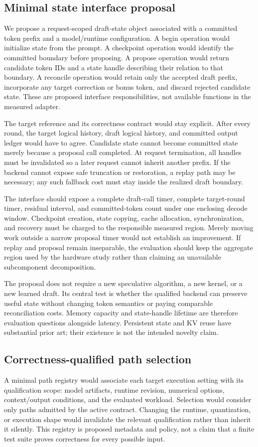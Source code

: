 \subsection{Minimal state interface proposal}
We propose a request-scoped draft-state object associated with a committed token prefix and a model/runtime configuration. A begin operation would initialize state from the prompt. A checkpoint operation would identify the committed boundary before proposing. A propose operation would return candidate token IDs and a state handle describing their relation to that boundary. A reconcile operation would retain only the accepted draft prefix, incorporate any target correction or bonus token, and discard rejected candidate state. These are proposed interface responsibilities, not available functions in the measured adapter.

The target reference and its correctness contract would stay explicit. After every round, the target logical history, draft logical history, and committed output ledger would have to agree. Candidate state cannot become committed state merely because a proposal call completed. At request termination, all handles must be invalidated so a later request cannot inherit another prefix. If the backend cannot expose safe truncation or restoration, a replay path may be necessary; any such fallback cost must stay inside the realized draft boundary.

The interface should expose a complete draft-call timer, complete target-round timer, residual interval, and committed-token count under one enclosing decode window. Checkpoint creation, state copying, cache allocation, synchronization, and recovery must be charged to the responsible measured region. Merely moving work outside a narrow proposal timer would not establish an improvement. If replay and proposal remain inseparable, the evaluation should keep the aggregate region used by the hardware study rather than claiming an unavailable subcomponent decomposition.

The proposal does not require a new speculative algorithm, a new kernel, or a new learned draft. Its central test is whether the qualified backend can preserve useful state without changing token semantics or paying comparable reconciliation costs. Memory capacity and state-handle lifetime are therefore evaluation questions alongside latency. Persistent state and KV reuse have substantial prior art; their existence is not the intended novelty claim.

\subsection{Correctness-qualified path selection}
A minimal path registry would associate each target execution setting with its qualification scope: model artifacts, runtime revision, numerical options, context/output conditions, and the evaluated workload. Selection would consider only paths admitted by the active contract. Changing the runtime, quantization, or execution shape would invalidate the relevant qualification rather than inherit it silently. This registry is proposed metadata and policy, not a claim that a finite test suite proves correctness for every possible input.

